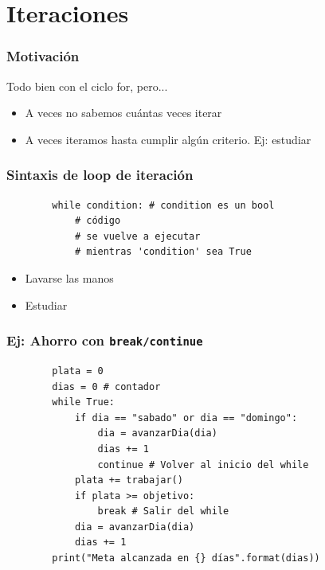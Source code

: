 \documentclass[14pt,aspectratio=169,xcolor=dvipsnames]{beamer}
\begin{document}
\section{Iteraciones}
\begin{frame}[fragile]\frametitle{Motivación}
    Todo bien con el ciclo for, pero...

    \begin{itemize}
        \item A veces no sabemos cuántas veces iterar
        \item A veces iteramos hasta cumplir algún criterio. Ej: estudiar
    \end{itemize}
\end{frame}
\begin{frame}[fragile]\frametitle{Sintaxis de loop de iteración}
    \begin{verbatim}
        while condition: # condition es un bool
            # código
            # se vuelve a ejecutar 
            # mientras 'condition' sea True
    \end{verbatim}
    
    \vspace{1cm}
    \begin{itemize}
        \item Lavarse las manos
        \item Estudiar
    \end{itemize}
\end{frame}
\begin{frame}[fragile]\frametitle{Ej: Ahorro con \texttt{break/continue}}
\begin{small}
    \begin{verbatim}
        plata = 0
        dias = 0 # contador
        while True: 
            if dia == "sabado" or dia == "domingo": 
                dia = avanzarDia(dia)
                dias += 1
                continue # Volver al inicio del while
            plata += trabajar()
            if plata >= objetivo:
                break # Salir del while
            dia = avanzarDia(dia)
            dias += 1
        print("Meta alcanzada en {} días".format(dias))
    \end{verbatim}
\end{small}
\end{frame}
\end{document}
